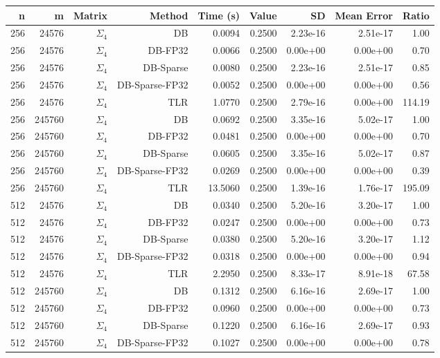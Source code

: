 \begin{tabular}{|r|r|r|r|r|r|r|r|r|}
  \hline
  \textbf{n} & \textbf{m} & \textbf{Matrix} & \textbf{Method} & \textbf{Time (s)} & \textbf{Value} & \textbf{SD} & \textbf{Mean Error} & \textbf{Ratio} \\
  \hline
  256 & 24576 & $\Sigma_4$ & DB & 0.0094 & 0.2500 & 2.23e-16 & 2.51e-17 & 1.00 \\
  256 & 24576 & $\Sigma_4$ & DB-FP32 & 0.0066 & 0.2500 & 0.00e+00 & 0.00e+00 & 0.70 \\
  256 & 24576 & $\Sigma_4$ & DB-Sparse & 0.0080 & 0.2500 & 2.23e-16 & 2.51e-17 & 0.85 \\
  256 & 24576 & $\Sigma_4$ & DB-Sparse-FP32 & 0.0052 & 0.2500 & 0.00e+00 & 0.00e+00 & 0.56 \\
  256 & 24576 & $\Sigma_4$ & TLR & 1.0770 & 0.2500 & 2.79e-16 & 0.00e+00 & 114.19 \\
  256 & 245760 & $\Sigma_4$ & DB & 0.0692 & 0.2500 & 3.35e-16 & 5.02e-17 & 1.00 \\
  256 & 245760 & $\Sigma_4$ & DB-FP32 & 0.0481 & 0.2500 & 0.00e+00 & 0.00e+00 & 0.70 \\
  256 & 245760 & $\Sigma_4$ & DB-Sparse & 0.0605 & 0.2500 & 3.35e-16 & 5.02e-17 & 0.87 \\
  256 & 245760 & $\Sigma_4$ & DB-Sparse-FP32 & 0.0269 & 0.2500 & 0.00e+00 & 0.00e+00 & 0.39 \\
  256 & 245760 & $\Sigma_4$ & TLR & 13.5060 & 0.2500 & 1.39e-16 & 1.76e-17 & 195.09 \\
  512 & 24576 & $\Sigma_4$ & DB & 0.0340 & 0.2500 & 5.20e-16 & 3.20e-17 & 1.00 \\
  512 & 24576 & $\Sigma_4$ & DB-FP32 & 0.0247 & 0.2500 & 0.00e+00 & 0.00e+00 & 0.73 \\
  512 & 24576 & $\Sigma_4$ & DB-Sparse & 0.0380 & 0.2500 & 5.20e-16 & 3.20e-17 & 1.12 \\
  512 & 24576 & $\Sigma_4$ & DB-Sparse-FP32 & 0.0318 & 0.2500 & 0.00e+00 & 0.00e+00 & 0.94 \\
  512 & 24576 & $\Sigma_4$ & TLR & 2.2950 & 0.2500 & 8.33e-17 & 8.91e-18 & 67.58 \\
  512 & 245760 & $\Sigma_4$ & DB & 0.1312 & 0.2500 & 6.16e-16 & 2.69e-17 & 1.00 \\
  512 & 245760 & $\Sigma_4$ & DB-FP32 & 0.0960 & 0.2500 & 0.00e+00 & 0.00e+00 & 0.73 \\
  512 & 245760 & $\Sigma_4$ & DB-Sparse & 0.1220 & 0.2500 & 6.16e-16 & 2.69e-17 & 0.93 \\
  512 & 245760 & $\Sigma_4$ & DB-Sparse-FP32 & 0.1027 & 0.2500 & 0.00e+00 & 0.00e+00 & 0.78 \\

\end{tabular}
